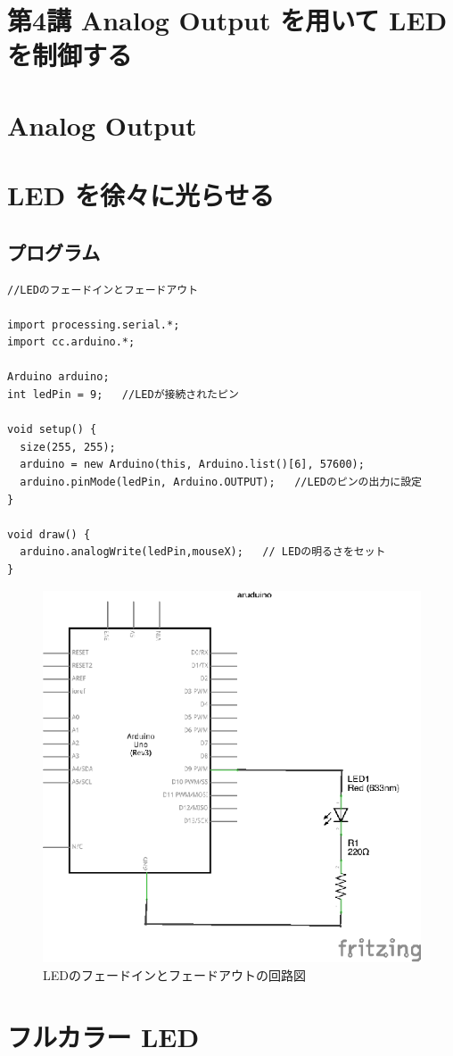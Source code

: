 \documentclass[11pt,a4paper]{jarticle}
\begin{document}
\section*{\LARGE{第4講 Analog Output を用いて LED を制御する}}


\section{Analog Output}

\section{LED を徐々に光らせる}
\subsection*{プログラム}
\begin{lstlisting}
//LEDのフェードインとフェードアウト

import processing.serial.*;
import cc.arduino.*;
 
Arduino arduino;
int ledPin = 9;   //LEDが接続されたピン

void setup() {
  size(255, 255);
  arduino = new Arduino(this, Arduino.list()[6], 57600);
  arduino.pinMode(ledPin, Arduino.OUTPUT);   //LEDのピンの出力に設定
}

void draw() {
  arduino.analogWrite(ledPin,mouseX);   // LEDの明るさをセット
}
\end{lstlisting}

\begin{figure}[h!]
 \centering
 \includegraphics[width=0.5\columnwidth]{img/LED.eps}
 \caption{LEDのフェードインとフェードアウトの回路図}
\end{figure}

\section{フルカラー LED}
\end{document}
